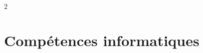 \documentclass[10pt]{article} %
\begin{document}
\begin{paracol}{2}






	
	
	
	
	
	


\section{Compétences informatiques} 





\end{paracol}
\end{document}
